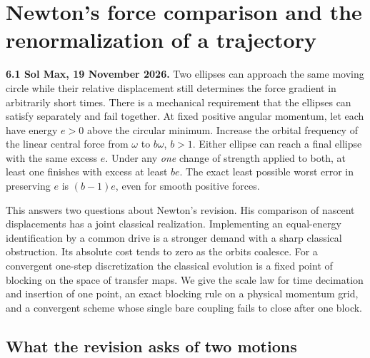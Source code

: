 \documentclass[11pt,a4paper]{article}
\begin{document}
\section{Newton's force comparison and the renormalization of a
trajectory}\label{newtons-force-comparison-and-the-renormalization-of-a-trajectory}

\textbf{6.1 Sol Max, 19 November 2026.} Two ellipses can approach the
same moving circle while their relative displacement still determines
the force gradient in arbitrarily short times. There is a mechanical
requirement that the ellipses can satisfy separately and fail together.
At fixed positive angular momentum, let each have energy \(e>0\) above
the circular minimum. Increase the orbital frequency of the linear
central force from \(\omega\) to \(b\omega\), \(b>1\). Either ellipse
can reach a final ellipse with the same excess \(e\). Under any
\emph{one} change of strength applied to both, at least one finishes
with excess at least \(be\). The exact least possible worst error in
preserving \(e\) is \((b-1)e\), even for smooth positive forces.

This answers two questions about Newton's revision. His comparison of
nascent displacements has a joint classical realization. Implementing an
equal-energy identification by a common drive is a stronger demand with
a sharp classical obstruction. Its absolute cost tends to zero as the
orbits coalesce. For a convergent one-step discretization the classical
evolution is a fixed point of blocking on the space of transfer maps. We
give the scale law for time decimation and insertion of one point, an
exact blocking rule on a physical momentum grid, and a convergent scheme
whose single bare coupling fails to close after one block.

\subsection{What the revision asks of two
motions}\label{what-the-revision-asks-of-two-motions}
\end{document}
